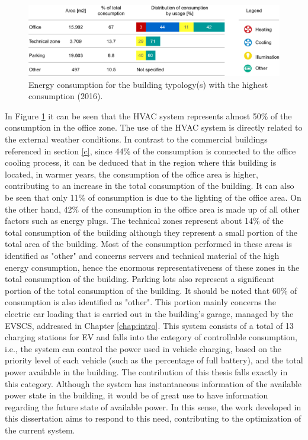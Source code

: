 \begin{figure}[h!]
    \centering
    \begin{center}
    \includegraphics[width=1\textwidth]{Images/ConsumoEDP.png}
    \caption{Energy consumption for the building typology(s) with the highest consumption (2016).}
    \label{consedp}
    \end{center}
\end{figure}
In Figure \ref{consedp} it can be seen that the \ac{HVAC} system represents almost 50\% of the consumption in the office zone. The use of the \ac{HVAC} system is directly related to the external weather conditions. In contrast to the commercial buildings referenced in section \ref{c}, since 44\% of the consumption is connected to the office cooling process, it can be deduced that in the region where this building is located, in warmer years, the consumption of the office area is higher, contributing to an increase in the total consumption of the building. It can also be seen that only 11\% of consumption is due to the lighting of the office area. On the other hand, 42\% of the consumption in the office area is made up of all other factors such as energy plugs. The technical zones represent about 14\% of the total consumption of the building although they represent a small portion of the total area of the building. Most of the consumption performed in these areas is identified as "other" and concerns servers and technical material of the high energy consumption, hence the enormous representativeness of these zones in the total consumption of the building. Parking lots also represent a significant portion of the total consumption of the building. It should be noted that 60\% of consumption is also identified as "other". This portion mainly concerns the electric car loading that is carried out in the building's garage, managed by the \ac{EVSCS}, addressed in Chapter \ref{chap:intro}. This system consists of a total of 13 charging stations for \ac{EV} and falls into the category of controllable consumption, i.e., the system can control the power used in vehicle charging, based on the priority level of each vehicle (such as the percentage of full battery), and the total power available in the building. The contribution of this thesis falls exactly in this category. Although the system has instantaneous information of the available power state in the building, it would be of great use to have information regarding the future state of available power. In this sense, the work developed in this dissertation aims to respond to this need, contributing to the optimization of the current system.


